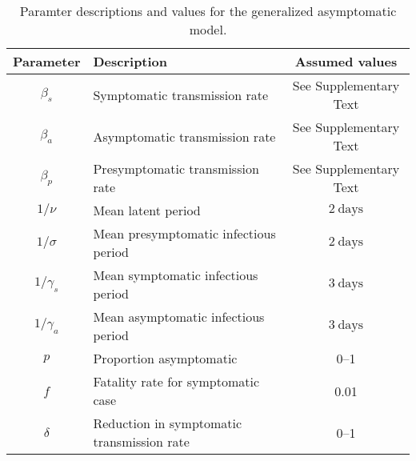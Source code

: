 \documentclass[12pt]{article}
\begin{document}
\begin{table}[h!]
  \begin{center}
    \begin{tabular}{c|l|c} %
      \textbf{Parameter} & \textbf{Description} & \textbf{Assumed values}\\
      \hline
      $\beta_s$ & Symptomatic transmission rate & See Supplementary Text\\
      \hline
      $\beta_a$ & Asymptomatic transmission rate & See Supplementary Text \\
      \hline
      $\beta_p$ & Presymptomatic transmission rate & See Supplementary Text \\
      \hline
      $1/\nu$ & Mean latent period & $2\ \mathrm{days}$\\
      \hline
      $1/\sigma$ & Mean presymptomatic infectious period & $2\ \mathrm{days}$\\
      \hline
      $1/\gamma_s$ & Mean symptomatic infectious period & $3\ \mathrm{days}$\\
      \hline
      $1/\gamma_a$ & Mean asymptomatic infectious period & $3\ \mathrm{days}$\\
      \hline
      $p$ & Proportion asymptomatic & 0--1\\
      \hline
      $f$ & Fatality rate for symptomatic case & 0.01\\
      \hline
      $\delta$ & Reduction in symptomatic transmission rate & 0--1\\
    \end{tabular}
    \caption{Paramter descriptions and values for the generalized asymptomatic model.}
    \label{tab:table1}
  \end{center}
\end{table}

\pagebreak
\end{document}
